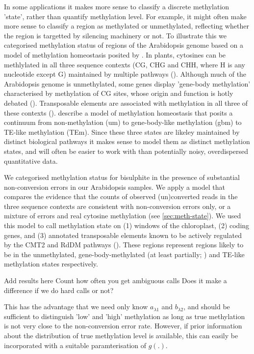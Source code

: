 \documentclass[12pt,longbibliography]{article}
\begin{document}
In some applications it makes more sense to classify a discrete methylation 'state', rather than quantify methylation level.
For example, it might often make more sense to classify a region as methylated or unmethylated, reflecting whether the region is targetted by silencing machinery or not.
To illustrate this we categorised methylation status of regions of the Arabidopsis genome based on a model of methylation homeostasis posited by \textcite{zhang2020natural}.
In plants, cytosines can be methlylated in all three sequence contexts (CG, CHG and CHH, where H is any nucleotide except G) maintained by multiple pathways (\cite{law2010establishing}).
Although much of the Arabidopsis genome is unmethylated, some genes display 'gene-body methylation' characterised by methylation of CG sites, whose origin and function is hotly debated (\cite{muyle2022gene}). 
Transposable elements are associated with methylation in all three of these contexts (\cite{cokus2008shotgun, lister2008highly}).
\textcite{zhang2020natural} describe a model of methylation homeostasis that posits a continuum from non-methylation (um) to gene-body-like methylation (gbm) to TE-like methylation (TEm).
Since these three states are likeley maintained by distinct biological pathways it makes sense to model them as distinct methylation states, and will often be easier to work with than potentially noisy, overdispersed quantitative data.

We categorised methylation status for bisulphite in the presence of substantial non-conversion errors in our Arabidopsis samples.
We apply a model that compares the evidence that the counts of observed (un)converted reads in the three sequence contexts are consistent with non-conversion errors only, or a mixture of errors and real cytosine methylation (see \ref{sec:meth-state}).
We used this model to call methylation state on (1) windows of the chloroplast, (2) coding genes, and (3) annotated transposable elements known to be actively regulated by the CMT2 and RdDM pathways (\cite{stroud2013comprehensive}).
These regions represent regions likely to be in the unmethylated, gene-body-methylated (at least partially; \cite{zhang2020natural}) and TE-like methylation states respectively.

Add results here
Count how often you get ambiguous calls
Does it make a difference if we do hard calls or not?

This has the advantage that we need only know $a_{\lambda1}$ and $b_{\lambda2}$, and should be sufficient to distinguish 'low' and 'high' methylation as long as true methylation is not very close to the non-conversion error rate.
However, if prior information about the distribution of true methylation level is available, this can easily be incorporated with a suitable paramterisation of $g(.)$.
\end{document}
